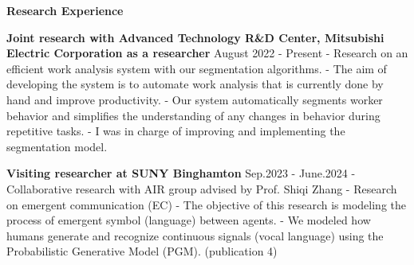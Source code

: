 \documentclass[a4paper,10pt]{article}
\begin{document}
\noindent
\begin{minipage}[t]{0.3\textwidth}
    \textbf{Research Experience}
\end{minipage}%
\begin{minipage}[t]{0.7\textwidth}
    \textbf{Joint research with Advanced Technology R\&D Center, Mitsubishi Electric Corporation as a researcher}  \hfill August 2022 - Present \newline
    - Research on an efficient work analysis system with our segmentation algorithms. \newline
    - The aim of developing the system is to automate work analysis that is currently done by hand and improve productivity. \newline
    - Our system automatically segments worker behavior and simplifies the understanding of any changes in behavior during repetitive tasks. \newline
    - I was in charge of improving and implementing the segmentation model. \newline

    \textbf{Visiting researcher at SUNY Binghamton}  \hfill Sep.2023 - June.2024 \newline
    - Collaborative research with AIR group advised by Prof. Shiqi Zhang\newline
    - Research on emergent communication (EC) \newline
    - The objective of this research is modeling the process of emergent symbol (language) between agents. \newline
    - We modeled how humans generate and recognize continuous signals (vocal language) using the Probabilistic Generative Model (PGM). (publication 4)  \newline
\end{minipage}

\vspace{10pt}
\end{document}
